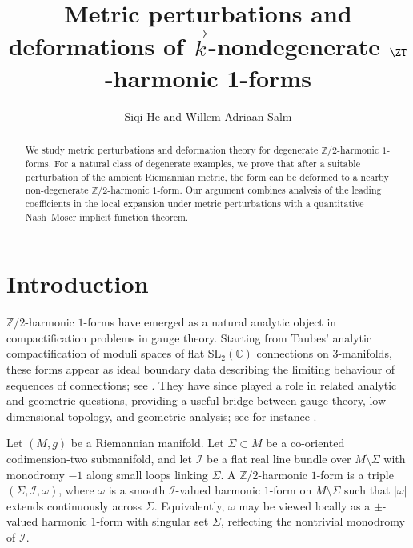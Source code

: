 \documentclass[11pt]{amsart}
\title{Metric perturbations and deformations of \texorpdfstring{$\vec{k}$}{k}-nondegenerate $\ZT$-harmonic 1-forms}
\author{Siqi He and Willem Adriaan Salm}
\begin{document}
\begin{abstract}
	We study metric perturbations and deformation theory for degenerate \(\mathbb{Z}/2\)-harmonic \(1\)-forms.
	For a natural class of degenerate examples, we prove that after a suitable perturbation of the ambient Riemannian metric, the form can be deformed to a nearby non-degenerate \(\mathbb{Z}/2\)-harmonic \(1\)-form.
	Our argument combines analysis of the leading coefficients in the local expansion under metric perturbations with a quantitative Nash--Moser implicit function theorem.
\end{abstract}
\maketitle

\section{Introduction}

\(\mathbb{Z}/2\)-harmonic \(1\)-forms have emerged as a natural analytic object in compactification problems in gauge theory.
Starting from Taubes' analytic compactification of moduli spaces of flat \(\mathrm{SL}_2(\mathbb{C})\) connections on \(3\)-manifolds, these forms appear as ideal boundary data describing the limiting behaviour of sequences of connections; see \cite{taubes2013compactness,Taubescompactness18,Tau13a,walpuskizhang2019compactness}. 
They have since played a role in related analytic and geometric questions, providing a useful bridge between gauge theory, low-dimensional topology, and geometric analysis; see for instance \cite{BeraWalpuski2025Dirac,Chen2025Perturbation,Donaldson2021,EsfahaniLi2024Fueter,he23branched,He2025, HeParkerWalpuski26Deformation,HeWentworthZhang2024Z2, Parker2026Deformations, Salm24,takahashi2015moduli, Yan2025Nondegenerate}.

Let \((M,g)\) be a Riemannian manifold.
Let \(\Sigma\subset M\) be a co-oriented codimension-two submanifold, and let \(\mathcal{I}\) be a flat real line bundle over \(M\setminus \Sigma\) with monodromy \(-1\) along small loops linking \(\Sigma\).
A \(\mathbb{Z}/2\)-harmonic \(1\)-form is a triple \((\Sigma,\mathcal{I},\omega)\), where \(\omega\) is a smooth \(\mathcal{I}\)-valued harmonic \(1\)-form on \(M\setminus \Sigma\) such that \(|\omega|\) extends continuously across \(\Sigma\).
Equivalently, \(\omega\) may be viewed locally as a $\pm$-valued harmonic \(1\)-form with singular set \(\Sigma\), reflecting the nontrivial monodromy of \(\mathcal{I}\).
\end{document}
